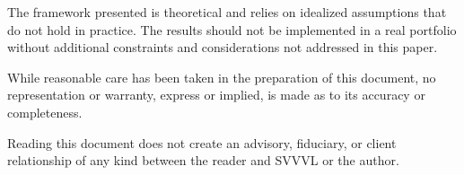 \documentclass[11pt]{article}
\begin{document}
The framework presented is theoretical and relies on idealized
assumptions that do not hold in practice. The results
should not be implemented in a real portfolio without additional
constraints and considerations not addressed in this paper.

While reasonable care has been taken in the preparation of this
document, no representation or warranty, express or implied, is made
as to its accuracy or completeness.

Reading this document does not create an advisory, fiduciary, or
client relationship of any kind between the reader and SVVVL or the
author.
\end{document}
